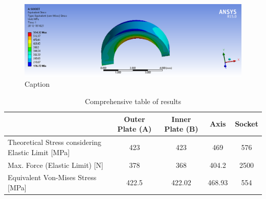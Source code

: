 \documentclass[a4paper 12pt]{article}
\begin{document}
\begin{figure}[!ht]
    \centering
    \includegraphics[width=1\textwidth]{images/SOCKET_STRESS.png}
    \caption{Caption}
    \label{fig:socket_stress}
\end{figure}


\begin{table}
\centering
\begin{tabular}{|p{4cm}|c|c|c|c|}
\hline
  & \textbf{Outer Plate (A)} & \textbf{Inner Plate (B)} & \textbf{Axis} & \textbf{Socket} \\
\hline
Theoretical Stress considering Elastic Limit [MPa] & 423 & 423 & 469 & 576 \\
\hline
Max. Force (Elastic Limit) [N] & 378 & 368 & 404.2 & 2500 \\
\hline
Equivalent Von-Mises Stress [MPa] & 422.5 & 422.02 & 468.93 & 554 \\
\hline
\end{tabular}
\caption{Comprehensive table of results}
\end{table}

%
\end{document}
